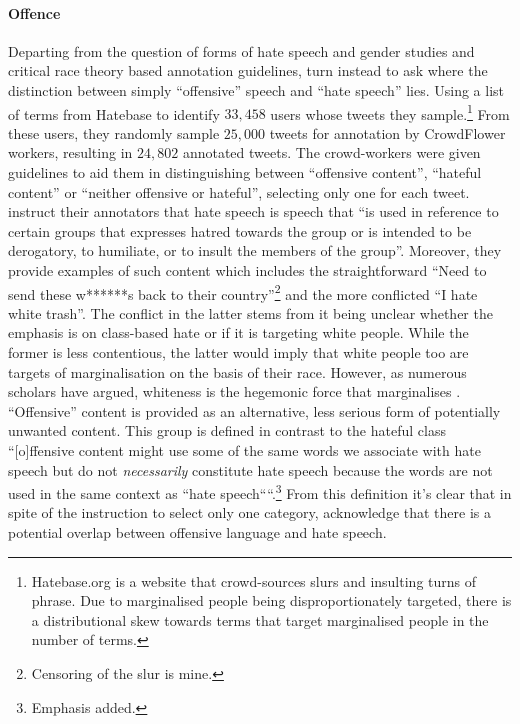 \paragraph*{Offence} Departing from the question of forms of hate speech and gender studies and critical race theory based annotation guidelines, \citet{Davidson:2017} turn instead to ask where the distinction between simply ``offensive'' speech and ``hate speech'' lies.
Using a list of terms from Hatebase to identify $33,458$ users whose tweets they sample.\footnote{Hatebase.org is a website that crowd-sources slurs and insulting turns of phrase. Due to marginalised people being disproportionately targeted, there is a distributional skew towards terms that target marginalised people in the number of terms.}
From these users, they randomly sample $25,000$ tweets for annotation by CrowdFlower workers, resulting in $24,802$ annotated tweets. 
The crowd-workers were given guidelines to aid them in distinguishing between ``offensive content'', ``hateful content'' or ``neither offensive or hateful'', selecting only one for each tweet. 
\citet{Davidson:2017} instruct their annotators that hate speech is speech that ``is used in reference to certain groups that expresses hatred towards the group or is intended to be derogatory, to humiliate, or to insult the members of the group''. 
Moreover, they provide examples of such content which includes the straightforward ``Need to send these w******s back to their country''\footnote{Censoring of the slur is mine.} and the more conflicted ``I hate white trash''. 
The conflict in the latter stems from it being unclear whether the emphasis is on class-based hate or if it is targeting white people. 
While the former is less contentious, the latter would imply that white people too are targets of marginalisation on the basis of their race. 
However, as numerous scholars have argued, whiteness is the hegemonic force that marginalises \citep{benjamin_race_2019,Noble:2018}.
``Offensive'' content is provided as an alternative, less serious form of potentially unwanted content. 
This group is defined in contrast to the hateful class ``[o]ffensive content might use some of the same words we associate with hate speech but do not \textit{necessarily} constitute hate speech because the words are not used in the same context as ``hate speech````.\footnote{Emphasis added.}
From this definition it's clear that in spite of the instruction to select only one category, \citet{Davidson:2017} acknowledge that there is a potential overlap between offensive language and hate speech. 
